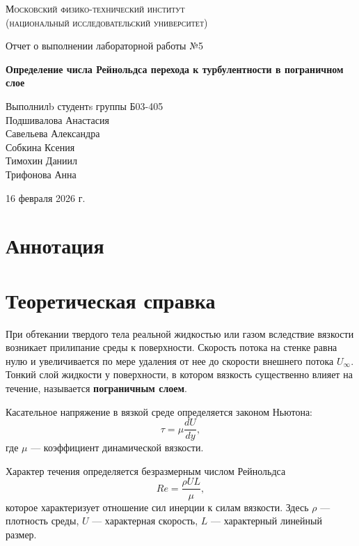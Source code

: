 \documentclass[12pt,a4paper]{article}
\def \TITLE {Отчет о выполнении лабораторной работы №5}
\def \SUBTITLE {Определение числа Рейнольдса перехода к турбулентности в пограничном слое}
\def \AUTHOR {Выполнилb студентs группы Б03-405\\ Подшивалова Анастасия \\ Савельева Александра \\ Собкина Ксения\\ Тимохин Даниил\\ Трифонова Анна}
\def \DATE {16 февраля 2026 г.}
\begin{document}
\begin{titlepage}
	\centering
	\vspace{5cm}
	{\scshape\large Московский физико-технический институт \\
	(национальный исследовательский университет)}
	
	\vspace{4cm}
	{\LARGE \TITLE}
	
	\vspace{1cm}
	{\Huge\bf \SUBTITLE }
	
	\vspace{1cm}
	\vfill
	
\begin{flushright}
	{\LARGE \AUTHOR}
\end{flushright}
	

	\vfill

	\DATE
\end{titlepage}

\newpage

\fontsize{12}{14}\selectfont

\section{ Аннотация}



\section{ Теоретическая справка}


При обтекании твердого тела реальной жидкостью или газом вследствие вязкости возникает прилипание среды к поверхности. Скорость потока на стенке равна нулю и увеличивается по мере удаления от нее до скорости внешнего потока $U_\infty$. Тонкий слой жидкости у поверхности, в котором вязкость существенно влияет на течение, называется \textbf{пограничным слоем}.

Касательное напряжение в вязкой среде определяется законом Ньютона:
\begin{equation}
\tau = \mu \frac{dU}{dy}, \tag{1}
\end{equation}
где $\mu$ — коэффициент динамической вязкости.

Характер течения определяется безразмерным числом Рейнольдса
\begin{equation}
Re = \frac{\rho U L}{\mu}, \tag{2}
\end{equation}
которое характеризует отношение сил инерции к силам вязкости. Здесь $\rho$ — плотность среды, $U$ — характерная скорость, $L$ — характерный линейный размер.
\end{document}
